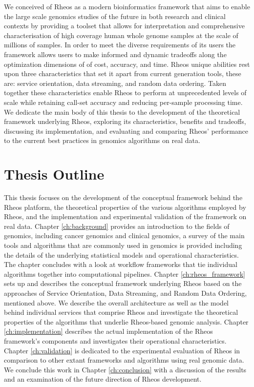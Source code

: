 We conceived of Rheos as a modern bioinformatics framework that aims to enable the large scale genomics studies of the future\autocite{england2016100,kaiser2016biden,margolis2014national} in both research and clinical contexts by providing a toolset that allows for interpretation and comprehensive characterisation of high coverage human whole genome samples at the scale of millions of samples. In order to meet the diverse requirements of its users the framework allows users to make informed and dynamic tradeoffs along the optimization dimensions of of cost, accuracy, and time. Rheos unique abilities rest upon three characteristics that set it apart from current generation tools, these are: service orientation, data streaming, and random data ordering. Taken together these characteristics enable Rheos to perform at unprecedented levels of scale while retaining call-set accuracy and reducing per-sample processing time. We dedicate the main body of this thesis to the development of the theoretical framework underlying Rheos, exploring its characteristics, benefits and tradeoffs, discussing its implementation, and evaluating and comparing Rheos' performance to the current best practices in genomics algorithms on real data.  

\section{Thesis Outline}

This thesis focuses on the development of the conceptual framework behind the Rheos platform, the theoretical properties of the various algorithms employed by Rheos, and the implementation and experimental validation of the framework on real data. Chapter \ref{ch:background} provides an introduction to the fields of genomics, including cancer genomics and clinical genomics, a survey of the main tools and algorithms that are commonly used in genomics is provided including the details of the underlying statistical models and operational characteristics. The chapter concludes with a look at workflow frameworks that tie individual algorithms together into computational pipelines. Chapter \ref{ch:rheos_framework} sets up and describes the conceptual framework underlying Rheos based on the approaches of Service Orientation, Data Streaming, and Random Data Ordering, mentioned above. We describe the overall architecture as well as the model behind individual services that comprise Rheos and investigate the theoretical properties of the algorithms that underlie Rheos-based genomic analysis. Chapter \ref{ch:implementation} describes the actual implementation of the Rheos framework's components and investigates their operational characteristics. Chapter \ref{ch:validation} is dedicated to the experimental evaluation of Rheos in comparison to other extant frameworks and algorithms using real genomic data. We conclude this work in Chapter \ref{ch:conclusion} with a discussion of the results and an examination of the future direction of Rheos development.


